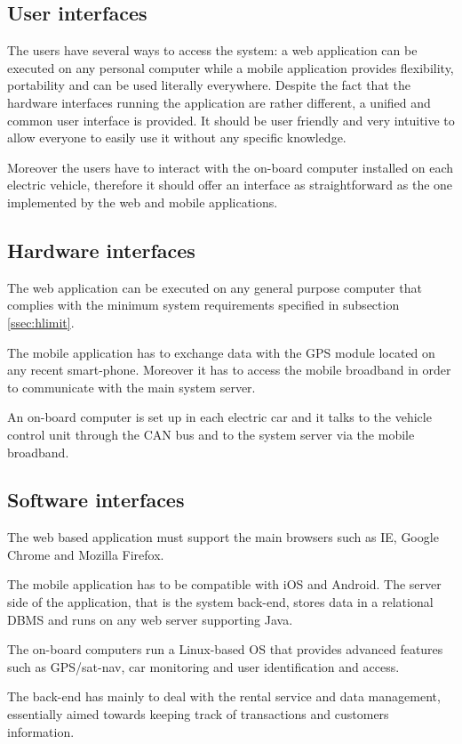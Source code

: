 \subsection{User interfaces}
The users have several ways to access the system: a web application can be executed on any personal computer while a mobile application provides flexibility, portability and can be used literally everywhere. Despite the fact that the hardware interfaces running the application are rather different, a unified and common user interface is provided. It should be user friendly and very intuitive to allow everyone to easily use it without any specific knowledge.

Moreover the users have to interact with the on-board computer installed on each electric vehicle, therefore it should offer an interface as straightforward as the one implemented by the web and mobile applications.

\subsection{Hardware interfaces}
The web application can be executed on any general purpose computer that complies with the minimum system requirements specified in subsection \ref{ssec:hlimit}.

The mobile application has to exchange data with the GPS module located on any recent smart-phone. Moreover it has to access the mobile broadband in order to communicate with the main system server.

An on-board computer is set up in each electric car and it talks to the vehicle control unit through the CAN bus and to the system server via the mobile broadband.

\subsection{Software interfaces}
The web based application must support the main browsers such as IE, Google Chrome and Mozilla Firefox.

The mobile application has to be compatible with iOS and Android. The server side of the application, that is the system back-end, stores data in a relational DBMS and runs on any web server supporting Java.

The on-board computers run a Linux-based OS that provides advanced features such as GPS/sat-nav, car monitoring and user identification and access.

The back-end has mainly to deal with the rental service and data management, essentially aimed towards keeping track of transactions and customers information.

